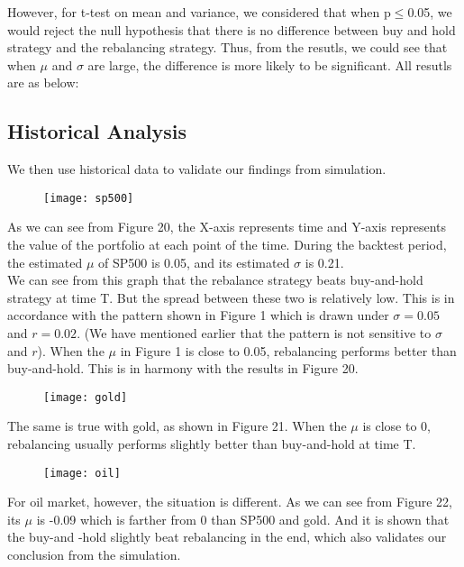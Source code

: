 \documentclass[
10pt, %
a4paper, %
oneside, %
headinclude,footinclude, %
BCOR5mm, %
]{scrartcl}
\begin{document}
However, for t-test on mean and variance, we considered that when p$\leq$0.05, we would reject the null hypothesis that there is no difference between buy and hold strategy and the rebalancing strategy. Thus, from the resutls, we could see that when $\mu$ and $\sigma$ are large, the difference is more likely to be significant. All resutls are as below: 

\subsection{Historical Analysis}
We then use historical data to validate our findings from simulation.
\begin{figure}[H]
	\centering
	\texttt{[image: sp500]}
	\caption{}
	\label{fig:sp500}
\end{figure}
As we can see from Figure 20, the X-axis represents time and Y-axis represents the value of the portfolio at each point of the time. During the backtest period, the estimated $\mu$ of SP500 is 0.05, and its estimated $\sigma$ is 0.21. \\

We can see from this graph that the rebalance strategy beats buy-and-hold strategy at time T. But the spread between these two is relatively low. This is in accordance with the pattern shown in Figure 1 which is drawn under $\sigma = 0.05$ and $r = 0.02$. (We have mentioned earlier that the pattern is not sensitive to $\sigma$ and $r$). When the $\mu$ in Figure 1 is close to 0.05, rebalancing performs better than buy-and-hold. This is in harmony with the results in Figure 20.\\

\begin{figure}[H]
	\centering
	\texttt{[image: gold]}
	\caption{}
	\label{fig:gold}
\end{figure}

The same is true with gold, as shown in Figure 21. When the $\mu$ is close to 0, rebalancing usually performs slightly better than buy-and-hold at time T.\\

\begin{figure}[H]
	\centering
	\texttt{[image: oil]}
	\caption{}
	\label{fig:oil}
\end{figure}

For oil market, however, the situation is different. As we can see from Figure 22, its $\mu$ is -0.09 which is farther from 0 than SP500 and gold. And it is shown that the buy-and -hold slightly beat rebalancing in the end, which also validates our conclusion from the simulation.
\end{document}
